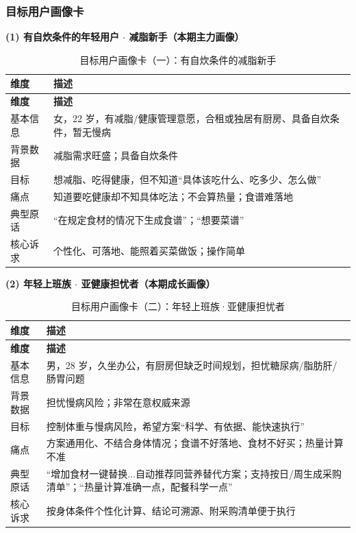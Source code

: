 \documentclass[12pt,a4paper]{ctexart}
\begin{document}
\subsubsection{目标用户画像卡}\label{sec:user-persona}

\noindent \textbf{(1) 有自炊条件的年轻用户 $\cdot$ 减脂新手（本期主力画像）}

\begin{xltabular}{\linewidth}{p{2.0cm}L}
\caption{目标用户画像卡（一）：有自炊条件的减脂新手} \\
\toprule
\textbf{维度} & \textbf{描述} \\
\midrule
\endfirsthead
\toprule
\textbf{维度} & \textbf{描述} \\
\midrule
\endhead
基本信息 & 女，22 岁，有减脂/健康管理意愿，合租或独居有厨房、具备自炊条件，暂无慢病 \\
背景数据 & 减脂需求旺盛；具备自炊条件 \\
目标 & 想减脂、吃得健康，但不知道“具体该吃什么、吃多少、怎么做” \\
痛点 & 知道要吃健康却不知具体吃法；不会算热量；食谱难落地 \\
典型原话 & “在规定食材的情况下生成食谱”；“想要菜谱” \\
核心诉求 & 个性化、可落地、能照着买菜做饭；操作简单 \\
\bottomrule
\end{xltabular}

\noindent \textbf{(2) 年轻上班族 $\cdot$ 亚健康担忧者（本期成长画像）}

\begin{xltabular}{\linewidth}{p{2.0cm}L}
\caption{目标用户画像卡（二）：年轻上班族·亚健康担忧者} \\
\toprule
\textbf{维度} & \textbf{描述} \\
\midrule
\endfirsthead
\toprule
\textbf{维度} & \textbf{描述} \\
\midrule
\endhead
基本信息 & 男，28 岁，久坐办公，有厨房但缺乏时间规划，担忧糖尿病/脂肪肝/肠胃问题 \\
背景数据 & 担忧慢病风险；非常在意权威来源 \\
目标 & 控制体重与慢病风险，希望方案“科学、有依据、能快速执行” \\
痛点 & 方案通用化、不结合身体情况；食谱不好落地、食材不好买；热量计算不准 \\
典型原话 & “增加食材一键替换$\ldots$自动推荐同营养替代方案；支持按日/周生成采购清单”；“热量计算准确一点，配餐科学一点” \\
核心诉求 & 按身体条件个性化计算、结论可溯源、附采购清单便于执行 \\
\bottomrule
\end{xltabular}
\end{document}
